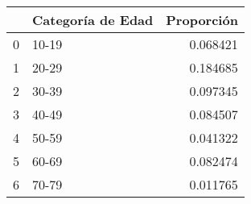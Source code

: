 \begin{tabular}{llr}
\toprule
 & Categoría de Edad & Proporción \\
\midrule
0 & 10-19 & 0.068421 \\
1 & 20-29 & 0.184685 \\
2 & 30-39 & 0.097345 \\
3 & 40-49 & 0.084507 \\
4 & 50-59 & 0.041322 \\
5 & 60-69 & 0.082474 \\
6 & 70-79 & 0.011765 \\
\bottomrule
\end{tabular}
